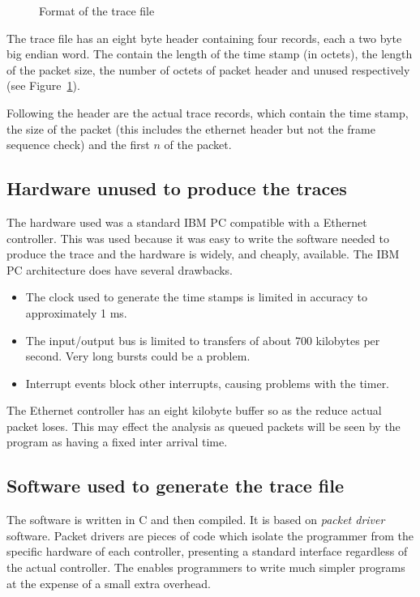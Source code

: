 \begin{figure}
\leavevmode
{}
\caption{Format of the trace file}
\label{trace:format}
\end{figure}

The trace file has an eight byte header containing four records, each
a two byte big endian word.  The contain the length of the time stamp
(in octets), the length of the packet size, the number of octets of
packet header and unused respectively (see Figure~\ref{trace:format}).

Following the header are the actual trace records, which contain the
time stamp, the size of the packet (this includes the ethernet header
but not the frame sequence check) and the first $n$ of the packet.

\subsection{Hardware unused to produce the traces}

The hardware used was a standard IBM PC compatible with a Ethernet
controller.  This was used because it was easy to write the software
needed to produce the trace and the hardware is widely, and cheaply,
available.  The IBM PC architecture does have several drawbacks.

\begin{itemize}
\item	The clock used to generate the time stamps is limited in
accuracy to approximately 1 ms.

\item	The input/output bus is limited to transfers of about 700
kilobytes per second.  Very long bursts could be a problem.

\item	Interrupt events block other interrupts, causing problems
with the timer.
\end{itemize}

The Ethernet controller has an eight kilobyte buffer so as the reduce
actual packet loses.  This may effect the analysis as queued packets
will be seen by the program as having a fixed inter arrival time.

\subsection{Software used to generate the trace file}

The software is written in C and then compiled.  It is based on {\em
packet driver} software.  Packet drivers are pieces of code which
isolate the programmer from the specific hardware of each controller,
presenting a standard interface regardless of the actual controller.
The enables programmers to write much simpler programs at the expense
of a small extra overhead.

